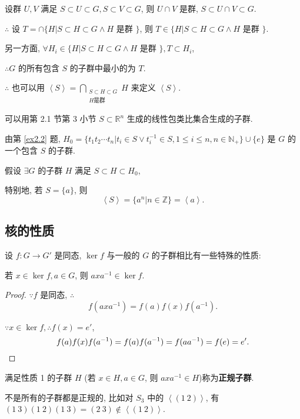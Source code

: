 \documentclass[color=black,device=normal,lang=cn,mode=geye]{elegantnote}
\begin{document}
设群 $U,V$ 满足 $S\subset U\subset G,S\subset V\subset G$, 则 $U\cap V$ 是群, $S\subset U\cap V\subset G$.

$\therefore$ 设 $T=\cap\{H|S\subset H\subset G\land H$ 是群 $\}$, 则 $T\in\{H|S\subset H\subset G\land H$ 是群 $\}$.

另一方面, $\forall H_i\in\{H|S\subset H\subset G\land H$ 是群 $\},T\subset H_i$,

$\therefore G$ 的所有包含 $S$ 的子群中最小的为 $T$.

$\therefore$ 也可以用 $\left<S\right>=\bigcap\limits_{\substack{S\subset H\subset G\\H\text{是群}}}H$ 来定义 $\left<S\right>$.

可以用第 2.1 节第 3 小节 $S\subset\mathbb{R}^n$ 生成的线性包类比集合生成的子群.

由第 \ref{ex2.2} 题, $H_0=\{t_1t_2\cdots t_n|t_i\in S\vee t_i^{-1}\in S,1\leq i\leq n,n\in\mathbb{N}_+\}\cup\{e\}$ 是 $G$ 的一个包含 $S$ 的子群.

假设 $\exists G$ 的子群 $H$ 满足 $S\subset H\subset H_0$,

特别地, 若 $S=\{a\}$, 则
\[\left<S\right>=\{a^n|n\in\mathbb{Z}\}=\left<a\right>.\]
\subsection{核的性质}
设 $f:G\to G'$ 是同态, $\ker f$ 与一般的 $G$ 的子群相比有一些特殊的性质:
\begin{property}
    若 $x\in\ker f,a\in G$, 则 $axa^{-1}\in\ker f$.
\end{property}
\begin{proof}
    $\because f$ 是同态, $\therefore$
    \[f(axa^{-1})=f(a)f(x)f(a^{-1}).\]

    $\because x\in\ker f,\therefore f(x)=e'$,
    \[f(a)f(x)f(a^{-1})=f(a)f(a^{-1})=f(aa^{-1})=f(e)=e'.\qedhere\]
\end{proof}
满足性质 1 的子群 $H$ (若 $x\in H,a\in G$, 则 $axa^{-1}\in H$)称为\textbf{正规子群}.

不是所有的子群都是正规的, 比如对 $S_3$ 中的 $\left<(1\ 2)\right>$, 有 $(1\ 3)(1\ 2)(1\ 3)=(2\ 3)\notin\left<(1\ 2)\right>$.
\end{document}
